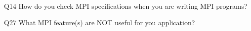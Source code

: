 \begin{description}%
\item{Q14} How do you check MPI specifications when you are writing MPI programs?%
\item{Q27} What MPI feature(s) are NOT useful for you application?%
\end{description}%
